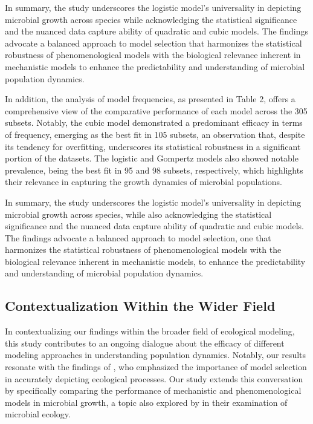 \documentclass[11pt]{article}
\begin{document}
\hfill\break
In summary, the study underscores the logistic model's universality in depicting microbial growth across species while acknowledging the statistical significance and the nuanced data capture ability of quadratic and cubic models. The findings advocate a balanced approach to model selection that harmonizes the statistical robustness of phenomenological models with the biological relevance inherent in mechanistic models to enhance the predictability and understanding of microbial population dynamics.

\hfill\break
In addition, the analysis of model frequencies, as presented in Table 2, offers a comprehensive view of the comparative performance of each model across the 305 subsets. Notably, the cubic model demonstrated a predominant efficacy in terms of frequency, emerging as the best fit in 105 subsets, an observation that, despite its tendency for overfitting, underscores its statistical robustness in a significant portion of the datasets. The logistic and Gompertz models also showed notable prevalence, being the best fit in 95 and 98 subsets, respectively, which highlights their relevance in capturing the growth dynamics of microbial populations. 

\hfill\break
In summary, the study underscores the logistic model's universality in depicting microbial growth across species, while also acknowledging the statistical significance and the nuanced data capture ability of quadratic and cubic models. The findings advocate a balanced approach to model selection, one that harmonizes the statistical robustness of phenomenological models with the biological relevance inherent in mechanistic models, to enhance the predictability and understanding of microbial population dynamics.


\subsection{Contextualization Within the Wider Field}
In contextualizing our findings within the broader field of ecological modeling, this study contributes to an ongoing dialogue about the efficacy of different modeling approaches in understanding population dynamics. Notably, our results resonate with the findings of \cite{Johnson2004}, who emphasized the importance of model selection in accurately depicting ecological processes. Our study extends this conversation by specifically comparing the performance of mechanistic and phenomenological models in microbial growth, a topic also explored by \cite{Zwietering1990} in their examination of microbial ecology.
\end{document}
